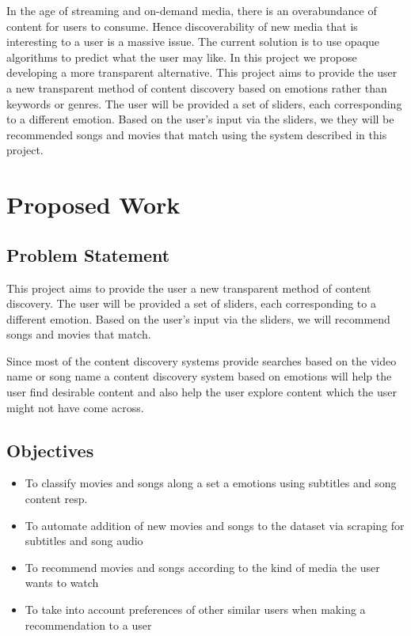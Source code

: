 \documentclass[12pt]{report} %
\begin{document}


\clearpage


	\vspace{2cm}
	\justifying\small{In the age of streaming and on-demand media, there is an overabundance of content for users to consume. Hence discoverability of new media that is interesting to a user is a massive issue. The current solution is to use opaque algorithms to predict what the user may like. In this project we propose developing a more transparent alternative. This project aims to provide the user a new transparent method of content discovery based on emotions rather than keywords or genres. The user will be provided a set of sliders, each corresponding to a different emotion. Based on the user’s input via the sliders, we they will be recommended songs and movies that match using the system described in this project. } \cite{bert}
\clearpage
\tableofcontents
\listoffigures






\chapter{Proposed Work}
\section{Problem Statement}
This project aims to provide the user a new transparent method of content discovery. The user will be provided a set of sliders, each corresponding to a different emotion. Based on the user’s input via the sliders, we will recommend songs and movies that match. \newline

Since most of the content discovery systems provide searches based on the video name or song name a content discovery system based on emotions will help the user find desirable content and also help the user explore content which the user might not have come across.

\section{Objectives}
\begin{itemize}
	\item To classify movies and songs along a set a emotions using subtitles and song content resp.
	\item To automate addition of new movies and songs to the dataset via scraping for subtitles and song audio
	\item To recommend movies and songs according to the kind of media the user wants to watch
	\item To take into account preferences of other similar users when making a recommendation to a user
\end{itemize}

\end{document}

